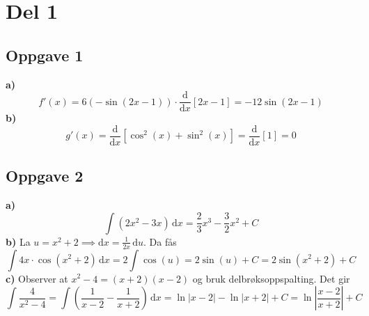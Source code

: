 


\newcommand{\fagkode}{R2}
\newcommand{\semesteraar}{høsten 2018}
\newcommand{\forfatter}{anonym}
\newcommand{\dokumenttittel}{Løsningsforslag -- Eksamen \fagkode, \semesteraar}

\usepackage{siunitx}


\newcommand{\logonavn}{}






\section{Del 1}
\subsection{Oppgave 1}
\textbf{a)} $$f'(x)=6(-\sin(2x-1)) \cdot \frac{\text{d}}{\text{d}x}\left[2x-1\right]=-12\sin(2x-1)$$ 
\textbf{b)} $$g'(x)=\frac{\text{d}}{\text{d}x}\left[\cos^2(x)+\sin^2(x) \right] = \frac{\text{d}}{\text{d}x}[1] = 0$$

\subsection{Oppgave 2}
\textbf{a)} $$ \int \left(2x^2-3x\right) \, \text{d}x = \frac23 x^3 - \frac32 x^2 + C$$ 
\textbf{b)} La $u=x^2+2 \implies \text{d}x = \frac{1}{2x} \, \text{d}u$. Da fås $$\int 4x \cdot \cos(x^2+2) \, \text{d}x = 2\int \cos(u) = 2\sin(u) + C = 2\sin(x^2+2) + C$$
\textbf{c)} Observer at $x^2-4=(x+2)(x-2)$ og bruk delbrøksoppspalting. Det gir $$\int \frac{4}{x^2-4} = \int \left(\frac{1}{x-2} - \frac{1}{x+2} \right) \, \text{d}x = \ln|x-2| - \ln|x+2| + C = \ln \left| \frac{x-2}{x+2}\right| + C$$

